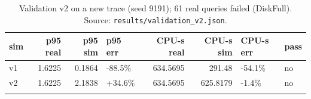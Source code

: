 \begin{table}[htbp]
\centering
\footnotesize
\caption{Validation v2 on a new trace (seed 9191); 61 real queries failed (DiskFull). Source: \texttt{results/validation\_v2.json}.}
\label{tab:valv2}
\setlength{\tabcolsep}{3pt}
\begin{tabular}{lrrlrrll}
\toprule
\textbf{sim} & \textbf{p95 real} & \textbf{p95 sim} & \textbf{p95 err} & \textbf{CPU-s real} & \textbf{CPU-s sim} & \textbf{CPU-s err} & \textbf{pass} \\
\midrule
v1 & 1.6225 & 0.1864 & -88.5\% & 634.5695 & 291.48 & -54.1\% & no \\
v2 & 1.6225 & 2.1838 & +34.6\% & 634.5695 & 625.8179 & -1.4\% & no \\
\botrule
\end{tabular}
\end{table}
